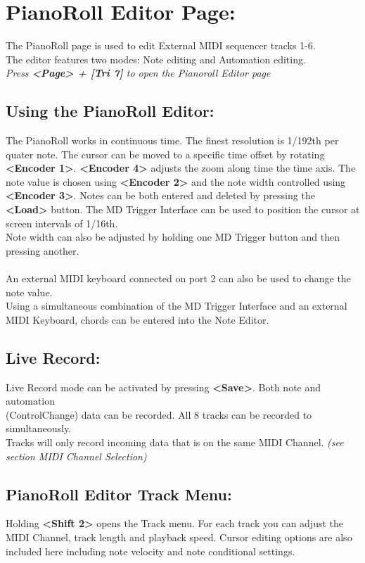 \chapter{PianoRoll Editor Page:}
The PianoRoll page is used to edit External MIDI sequencer tracks 1-6.\\
The editor features two modes: Note editing and Automation editing.
\\
\textit{Press \textbf{<Page> + [Tri 7]} to open the Pianoroll Editor page}
\section{Using the PianoRoll Editor:}
The PianoRoll works in continuous time. The finest resolution is 1/192th per quater note. The cursor can be moved to a specific time offset by rotating \textbf{<Encoder 1>}. \textbf{<Encoder 4>} adjusts the zoom along time the time axis. The note value is chosen using \textbf{<Encoder 2>} and the note width controlled using \textbf{<Encoder 3>}. Notes can be both entered and deleted by pressing the \textbf{<Load>} button.
\newpage
The MD Trigger Interface can be used to position the cursor at screen intervals of 1/16th.\\
Note width can also be adjusted by holding one MD Trigger button and then pressing another.\\\\
An external MIDI keyboard connected on port 2 can also be used to change the note value.\\
Using a simultaneous combination of the MD Trigger Interface and an external MIDI Keyboard, chords can be entered into the Note Editor.
\section{Live Record:}
Live Record mode can be activated by pressing  \textbf{<Save>}. Both note and automation \\(ControlChange) data can be recorded. All 8 tracks can be recorded to simultaneously.
\\Tracks will only record incoming data that is on the same MIDI Channel. \textit{(see section MIDI Channel Selection)}

\section{PianoRoll Editor Track Menu:}
Holding \textbf{<Shift 2>} opens the Track menu. For each track you can adjust the MIDI Channel, track length and playback speed. Cursor editing options are also included here including note velocity and note conditional settings.

